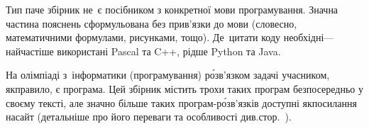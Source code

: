 Тип паче збірник не~є посібником з конкретної мови програмування. Значна частина пояснень сформульована без прив'язки до мови (словесно, математичними формулами, рисунками, тощо). Де~цитати коду необхідні\nolinebreak[3] --- найчастіше використані Pascal та C++, рідше Python та Java.


На олімпіаді з~інформатики (програмування) р\'{о}зв'язком задачі учасником, як\nolinebreak[3] правило, є програма. 
Цей збірник містить трохи таких програм безпосередньо у своєму тексті, але значно більше таких про\-грам-р\'{о}зв'\-яз\-ків доступні як\nolinebreak[3] посилання на\nolinebreak[3] 
сайт \IdeOneName{} (детальніше про його переваги та особливості див.\nolinebreak[3] стор.~\pageref{text:FAQ-section-about-ideone-com}). 


